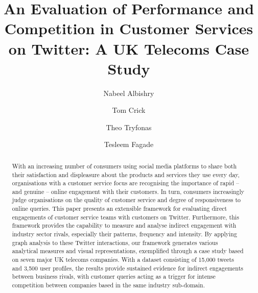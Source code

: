 \documentclass[sigconf]{acmart}
\begin{document}
\title[An Evaluation of Performance and Competition in Customer Services on
  Twitter]{An Evaluation of Performance and Competition in Customer Services on
  Twitter: A UK Telecoms Case Study}

\author{Nabeel Albishry}

\author{Tom Crick}

\author{Theo Tryfonas}

\author{Tesleem Fagade}


 
\renewcommand{\shortauthors}{Albishry, Crick, Tryfonas, and Fagade}


\begin{abstract}
With an increasing number of consumers using social media platforms to
share both their satisfaction and displeasure about the products and
services they use every day, organisations with a customer service
focus are recognising the importance of rapid -- and genuine -- online
engagement with their customers. In turn, consumers increasingly judge
organisations on the quality of customer service and degree of
responsiveness to online queries. This paper presents an extensible
framework for evaluating direct engagements of customer service teams
with customers on Twitter. Furthermore, this framework provides the
capability to measure and analyse indirect engagement with industry
sector rivals, especially their patterns, frequency and intensity. By
applying graph analysis to these Twitter interactions, our framework
generates various analytical measures and visual representations,
exemplified through a case study based on seven major UK telecoms
companies. With a dataset consisting of 15,000 tweets and 3,500 user
profiles, the results provide sustained evidence for indirect
engagements between business rivals, with customer queries acting as a
trigger for intense competition between companies based in the same
industry sub-domain.
\end{abstract}
\end{document}
